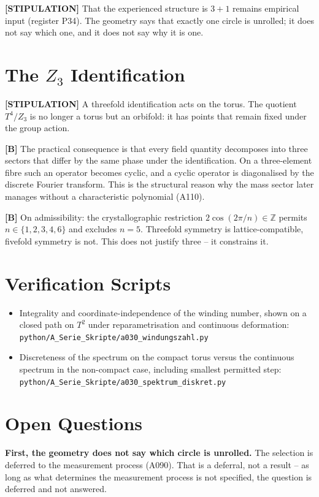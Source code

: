 \textbf{[STIPULATION]} That the experienced structure is $3+1$ remains
empirical input (register P34). The geometry says that exactly one circle
is unrolled; it does not say which one, and it does not say why it is one.

\section{The $Z_3$ Identification}

\textbf{[STIPULATION]} A threefold identification acts on the torus. The
quotient $T^4/Z_3$ is no longer a torus but an orbifold: it has points
that remain fixed under the group action.

\textbf{[B]} The practical consequence is that every field quantity decomposes
into three sectors that differ by the same phase under the identification.
On a three-element fibre such an operator becomes cyclic, and a cyclic operator
is diagonalised by the discrete Fourier transform. This is the structural reason
why the mass sector later manages without a characteristic polynomial (A110).

\textbf{[B]} On admissibility: the crystallographic restriction
$2\cos(2\pi/n)\in\mathbb{Z}$ permits $n\in\{1,2,3,4,6\}$ and excludes $n=5$.
Threefold symmetry is lattice-compatible, fivefold symmetry is not. This does
not justify three -- it constrains it.

\section{Verification Scripts}

\begin{itemize}
  \item Integrality and coordinate-independence of the winding number, shown
    on a closed path on $T^2$ under reparametrisation and continuous deformation:
    \texttt{python/A\_Serie\_Skripte/a030\_windungszahl.py}
  \item Discreteness of the spectrum on the compact torus versus the continuous
    spectrum in the non-compact case, including smallest permitted step:
    \texttt{python/A\_Serie\_Skripte/a030\_spektrum\_diskret.py}
\end{itemize}

\section{Open Questions}

\textbf{First, the geometry does not say which circle is unrolled.} The
selection is deferred to the measurement process (A090). That is a deferral,
not a result -- as long as what determines the measurement process is not
specified, the question is deferred and not answered.

